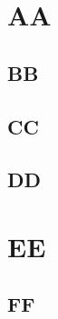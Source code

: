 \documentclass{article}
\begin{document}
    \section{AA}
    \subsection{BB}
    \subsection{CC}
    \subsection{DD}
    \section{EE}
    \subsection{FF}
\end{document}
